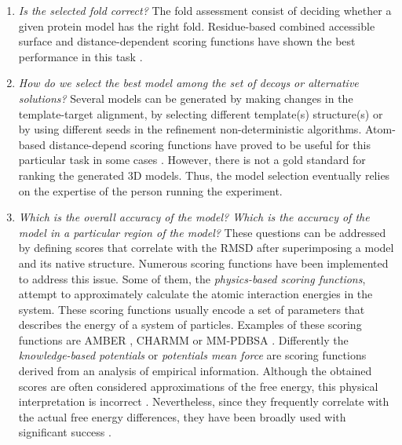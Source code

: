 \documentclass[12pt, b5paper,twoside]{tesi_upf}
\begin{document}
\begin{enumerate}
\begin{enumerate}[label=\roman*]
\item \textit{Is the selected fold correct?} The fold assessment consist of deciding whether a given protein model has the right fold. Residue-based combined accessible surface and distance-dependent scoring functions have shown the best performance in this task \cite{Melo2002}. 
\item \textit{How do we select the best model among the set of decoys or alternative solutions?} Several models can be generated by making changes in the template-target alignment, by selecting different template(s) structure(s) or by using different seeds in the refinement non-deterministic algorithms. Atom-based distance-depend scoring functions have proved to be useful for this particular task in some cases \cite{Samudrala1998}. However, there is not a gold standard for ranking the generated 3D models. Thus, the model selection eventually relies on the expertise of the person running the experiment. 
\item \textit{Which is the overall accuracy of the model? Which is the accuracy of the model in a particular region of the model?} These questions can be addressed by defining scores that correlate with the RMSD after superimposing a model and its native structure. Numerous scoring functions have been implemented to address this issue. Some of them, the \textit{physics-based scoring functions}, attempt  to  approximately  calculate the  atomic  interaction  energies  in  the  system. These scoring functions usually encode a set of parameters that describes the energy of a system of particles. Examples of these scoring functions are AMBER \cite{CASE2005}, CHARMM \cite{Brooks1983} or MM-PDBSA \cite{Fogolari2003}. Differently the \textit{knowledge-based potentials} or \textit{potentials mean force} are scoring functions derived from an analysis of empirical information. Although the obtained scores are often considered approximations of the free energy, this physical interpretation is incorrect \cite{Thomas1996}. Nevertheless, since they frequently correlate with the actual free energy differences, they have been broadly used with significant success \cite{Shen2006, Zhou2002, Sippl1995}. 
\end{enumerate}
\end{enumerate}
\end{document}
